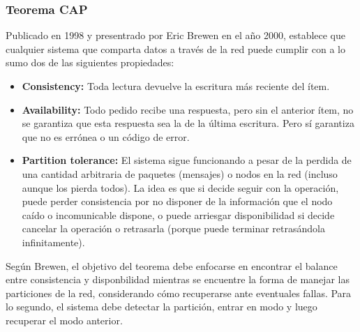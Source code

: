 \subsubsection*{Teorema CAP}
Publicado en 1998 y presentrado por Eric Brewen en el año 2000, establece que cualquier sistema que comparta datos a través de la red puede cumplir con a lo sumo dos de las siguientes propiedades:
\begin{itemize}
    \item \textbf{Consistency:} Toda lectura devuelve la escritura más reciente del ítem.
    \item \textbf{Availability:} Todo pedido recibe una respuesta, pero sin el anterior ítem, no se garantiza que esta respuesta sea la de la última escritura. Pero sí garantiza que no es errónea o un código de error.
    \item \textbf{Partition tolerance:} El sistema sigue funcionando a pesar de la perdida de una cantidad arbitraria de paquetes (mensajes) o nodos en la red (incluso aunque los pierda todos). La idea es que si decide seguir con la operación, puede perder consistencia por no disponer de la información que el nodo caído o incomunicable dispone, o puede arriesgar disponibilidad si decide cancelar la operación o retrasarla (porque puede terminar retrasándola infinitamente).
\end{itemize}
Según Brewen, el objetivo del teorema debe enfocarse en encontrar el balance entre consistencia y disponbilidad mientras se encuentre la forma de manejar las particiones de la red, considerando cómo recuperarse ante eventuales fallas. Para lo segundo, el sistema debe detectar la partición, entrar en modo  y luego recuperar el modo anterior.

